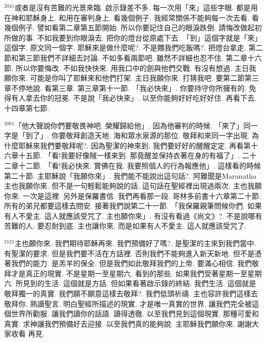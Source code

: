 \documentclass{book}
\begin{document}
$^{2041}$或者是沒有苦難的光景來臨.
啟示錄差不多.
每一次用「來」這些字眼.
都是用在神和耶穌身上.
和用在審判身上.
看幾個例子.
我經常關係不能夠每一次去看.
看幾個例子.
譬如看第二章第五節開始.
所以你要記住自己的眼淚跌倒.
請悔改做起初所做的事.
不如我要到你眼淚去.
把你的燈台從原處下去.
「到」這個字就是「來」這個字.
原文同一個字.
耶穌來是做什麼呢?.
不是餵我們吃飯嗎?.
把燈台拿走.
第二節和第三節我們不詳細去討論.
不如多看兩節吧.
雖然不詳細也忍不住.
第二章十六節.
所以你要悔改.
不如我快快來.
用我口中的劍與他們交戰.
有沒有想過.
主日我願你來.
可能是你叫了耶穌來和他們打架.
主日我願你來.
打猜我吧.
要第二節第三章不停地說.
看第三章.
第三章第十一節.
「我必快來」.
你要持守你所擁有的.
免得有人拿去你的冠冕.
不是說「我必快來」.
以至你能夠好好吃好好住.
再看下去.
十四章第七節.

$^{2081}$「他大聲說你們要敬畏神吧.
榮耀歸給他」.
因為他審判的時候.
「來了」同一字是「到了」.
你要敬拜創造天地.
海和眾水泉源的那位.
敬拜和來同一字出現.
為什麼耶穌來我們要敬拜呢?.
因為聖潔的神來到.
我們要好好的醒醒定定.
再看第十六章十五節.
「看!我要好像賊一樣來到.
那竟醒並保持衣著在身的有福了」.
二十二章十二節.
「看!我必快來.
賞佛在我.
我要照個人的行為報應他」.
這樣看的時候第二十節.
主耶穌說「我願你來」.
我們能不能說出這句話?.
阿難聞是Maranatha主也我願你來.
但不是一句輕鬆能夠說的話.
這句話在聖經裡出現過兩次.
主也我願你來.
一次是這裡.
另外是保羅書信.
我們再看那一段.
哥林多前書十六章第二十節.
所有的弟兄都要這樣去問安.
接著我們說第二十一節.
「我保羅親筆問候你們.
如果有人不愛主.
這人就應該受咒了.
主也願你來」.
有沒有看過《尚文》?.
不是說哪有苦難的人.
要忍耐到底.
主也讓你來.
而是如果有人不愛主.
這人就應該受咒了.

$^{2121}$主也願你來.
我們期待耶穌再來.
我們預備好了嗎?.
是聖潔的主來到我們當中.
有聖潔的要求.
但是我們要不活在方話裡.
否則我們不能夠進入新天新地.
但不是憑著我們的能力.
是羔羊的保全.
但是我們如此敬拜我們的上帝.
要滿心相信.
我們敬拜才是真正的現實.
不是星期一至星期六.
看到的那些.
如果我們受著星期一至星期六.
所見到的生活.
這個就是方話.
但如果看著啟示錄的終結.
我們生活.
這個就是敬拜獨一的真實.
我們願不願意這樣去敬拜?.
我們低頭祈禱.
主也容許我們這樣去敬拜你.
熟讀聖言.
明白聖經所描述的現實.
才是唯一真實的世界.
讓我們完全被這個世界所勸服.
讓我們讀你的話語.
讀得透徹.
以至我們見到這個現實.
那種可愛和真實.
求神讓我們預備好去迎接.
以至我們真的能夠說.
主耶穌我們願你來.
謝謝大家收看 再見.
\newpage
\end{document}
